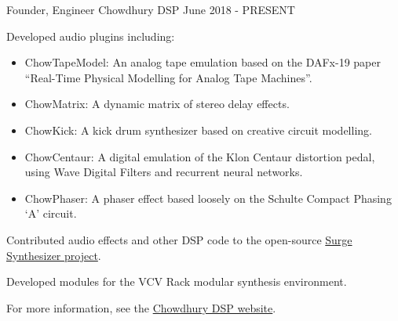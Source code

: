 

\begin{cventries}

  \cventry
    {Founder, Engineer} %
    {Chowdhury DSP} %
    {} %
    {June 2018 - PRESENT} %
    {
      \begin{cvitems} %
        \item {Developed audio plugins including:}
        \begin{itemize}
            \item {ChowTapeModel: An analog tape emulation based on the DAFx-19 paper ``Real-Time Physical Modelling for Analog Tape Machines''.}
            \item {ChowMatrix: A dynamic matrix of stereo delay effects.}
            \item {ChowKick: A kick drum synthesizer based on creative circuit modelling.}
            \item {ChowCentaur: A digital emulation of the Klon Centaur distortion pedal, using Wave Digital Filters and recurrent neural networks.}
            \item {ChowPhaser: A phaser effect based loosely on the Schulte Compact Phasing `A' circuit.}
        \end{itemize}
        \item {Contributed audio effects and other DSP code to the open-source \href{https://surge-synthesizer.github.io}{Surge Synthesizer project}.}
        \item {Developed modules for the VCV Rack modular synthesis environment.}
        \item {For more information, see the \href{https://chowdsp.com}{Chowdhury DSP website}.}
      \end{cvitems}
    }


\end{cventries}
